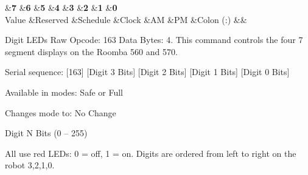 \begin{Desc}
\begin{description}
\begin{TabularC}{9}
\hline
{}&{\bf 7 }&{\bf 6 }&{\bf 5 }&{\bf 4 }&{\bf 3 }&{\bf 2 }&{\bf 1 }&{\bf 0  }\\
Value &Reserved &Schedule &Clock &A\+M &P\+M &Colon (\+:) &&\\
\end{TabularC}
\item[{\em 
\hypertarget{group__roomba-lib_gga305e17dfb7050ad83ea49ded2e6a2e24acd27e02da97cb9cc482177a27e135c45}{}R\+O\+O\+M\+B\+A\+\_\+\+D\+I\+G\+I\+T\+\_\+\+L\+E\+D\+S\+\_\+\+R\+A\+W\label{group__roomba-lib_gga305e17dfb7050ad83ea49ded2e6a2e24acd27e02da97cb9cc482177a27e135c45}
}]Digit L\+E\+Ds Raw Opcode\+: 163 Data Bytes\+: 4. This command controls the four 7 segment displays on the Roomba 560 and 570.
\begin{DoxyItemize}
\item Serial sequence\+: \mbox{[}163\mbox{]} \mbox{[}Digit 3 Bits\mbox{]} \mbox{[}Digit 2 Bits\mbox{]} \mbox{[}Digit 1 Bits\mbox{]} \mbox{[}Digit 0 Bits\mbox{]}
\item Available in modes\+: Safe or Full
\item Changes mode to\+: No Change
\item Digit N Bits (0 – 255)
\item All use red L\+E\+Ds\+: 0 = off, 1 = on. Digits are ordered from left to right on the robot 3,2,1,0.
\end{DoxyItemize}


\end{description}
\end{Desc}
